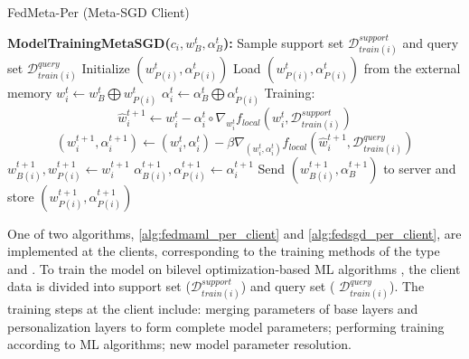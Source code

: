 \documentclass[runningheads]{llncs}
\begin{document}
\begin{algorithm}[h]
    \caption{FedMeta-Per (Meta-SGD Client)} \label{alg:fedsgd_per_client}
    \begin{algorithmic}[1]
        \State\textbf{ModelTrainingMetaSGD($c_i, w_B^t, \alpha_B^t$):}
        \State Sample support set $\mathcal{D}_{train(i)}^{support}$ and query set $\mathcal{D}_{train(i)}^{query}$
            \State Initialize $(w_{P(i)}^t, \alpha_{P(i)}^t)$
        \Else
            \State Load $(w_{P(i)}^t, \alpha_{P(i)}^t)$ from the external memory
        \EndIf
        \State $w_i^t \gets w_B^t \bigoplus w_{P(i)}^t$ 
        \State $\alpha_i^t \gets \alpha_B^t \bigoplus \alpha_{P(i)}^t$ 
        \State Training:
        \begin{dmath*}
            \hat{w}_{i}^{t+1} \gets w_{i}^t - \alpha_i^t\circ\nabla_{w_i^t} f_{local}\left(w_{i}^t, \mathcal{D}_{train(i)}^{support}\right)
        \end{dmath*}
        \begin{dmath*}
            (w_{i}^{t+1}, \alpha_i^{t+1}) \gets (w_{i}^t, \alpha_{i}^{t}) - \beta\nabla_{(w_i^t, \alpha_i^t)} f_{local}\left(\hat{w}_{i}^{t+1}, \mathcal{D}_{train(i)}^{query}\right)
        \end{dmath*}
        \State $w_{B(i)}^{t+1}, w_{P(i)}^{t+1} \gets w_i^{t+1}$ 
        \State $\alpha_{B(i)}^{t+1}, \alpha_{P(i)}^{t+1} \gets \alpha_i^{t+1}$ 
        \State Send $(w_{B(i)}^{t+1}, \alpha_B^{t+1})$ to server and store $(w_{P(i)}^{t+1}, \alpha_{P(i)}^{t+1})$
    \end{algorithmic}
\end{algorithm}

One of two algorithms, \ref{alg:fedmaml_per_client} and \ref{alg:fedsgd_per_client}, are implemented at the clients, corresponding to the training methods of the type  and . To train the model on bilevel optimization-based ML algorithms , the client data is divided into support set ($\mathcal{D}_{train(i)}^{support}$) and query set ( $\mathcal{D}_{train(i)}^{query}$). The training steps at the client include: merging parameters of base layers and personalization layers to form complete model parameters; performing training according to ML algorithms; new model parameter resolution.
\end{document}
